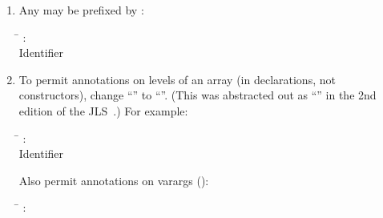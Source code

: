 \documentclass[10pt]{article}
\begin{document}
\begin{enumerate}
\item
Any  may be prefixed by :

\begin{tabbing}
\qquad \= \kill
    : \\
\qquad            {} Identifier   \multi{\term{[]}} \\
\qquad            {} 
\end{tabbing}


% 
% 


\item
To permit annotations on levels of an array (in declarations, not
constructors), change ``\multi{\term{[]}}''  to
``''.
(This was abstracted out as
``'' in the 2nd edition of the JLS~\cite{GoslingJSB2000}.)
For example:

\begin{tabbing}
\qquad \= \kill
    : \\
\qquad            {} Identifier   \\
\qquad            {} 
\end{tabbing}

Also permit annotations on varargs ():

\begin{tabbing}
\qquad \= \kill
    : \\
\qquad             {}  \\
\qquad            {}  
\end{tabbing}



\end{enumerate}
\end{document}
